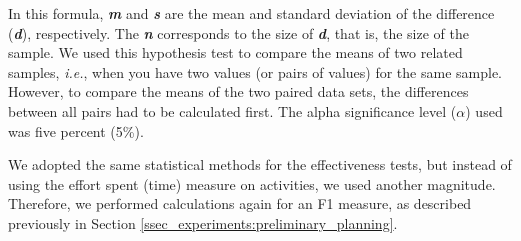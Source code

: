 In this formula, \textit{\textbf{m}} and \textit{\textbf{s}} are the mean and standard deviation of the difference (\textbf{\textit{d}}), respectively.
The \textit{\textbf{n}} corresponds to the size of \textit{\textbf{d}}, that is, the size of the sample.
We used this hypothesis test to compare the means of two related samples, \textit{i.e.}, when you have two values (or pairs of values) for the same sample.
However, to compare the means of the two paired data sets, the differences between all pairs had to be calculated first.
The alpha significance level ($\alpha$) used was five percent (5\%).

We adopted the same statistical methods for the effectiveness tests, but instead of using the effort spent (time) measure on activities, we used another magnitude.
Therefore, we performed calculations again for an F1 measure, as described previously in Section \ref{ssec_experiments:preliminary_planning}.


